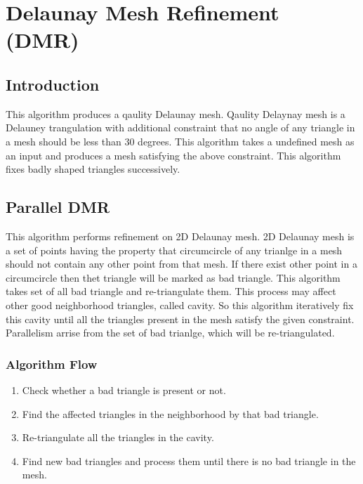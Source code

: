 \documentclass{article}
\begin{document}

\section{Delaunay Mesh Refinement (DMR) }

\subsection{Introduction}

This algorithm produces a qaulity Delaunay mesh. Qaulity Delaynay mesh is a Delauney trangulation with additional constraint that no angle of any triangle in a mesh should be less than 30 degrees. This algorithm takes a undefined mesh as an input and produces a mesh satisfying the above constraint. This algorithm fixes badly shaped triangles successively. 


\subsection{Parallel DMR}

This algorithm performs refinement on 2D Delaunay mesh. 2D Delaunay mesh is a set of points having the property that circumcircle of any trianlge in a mesh should not contain any other point from that mesh. If there exist other point in a circumcircle then thet triangle will be marked as bad triangle. This algorithm takes set of all bad triangle and re-triangulate them. This process may affect other good neighborhood triangles, called cavity. So this algorithm iteratively fix this cavity until all the triangles present in the mesh satisfy the given constraint. Parallelism arrise from the set of bad trianlge, which will be re-triangulated.

\subsubsection{Algorithm Flow}
\begin{enumerate}
\item Check whether a bad triangle is present or not.
\item Find the affected triangles in the neighborhood by that bad triangle.
\item Re-triangulate all the triangles in the cavity.
\item Find new bad triangles and process them until there is no bad triangle in the mesh.
\end{enumerate}
\end{document}
